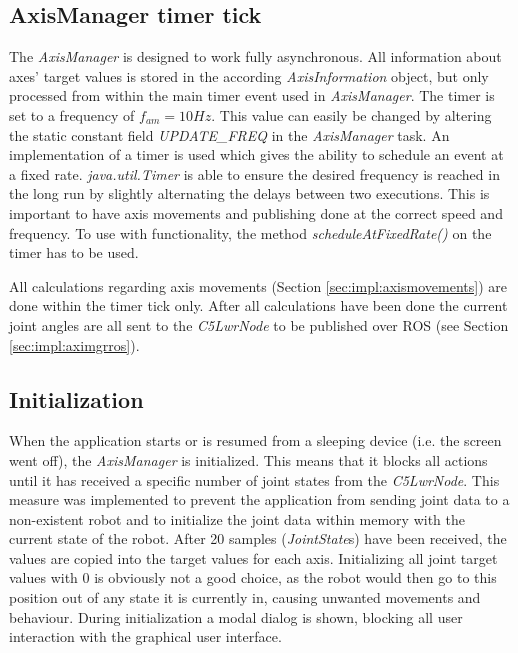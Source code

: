 \subsection{AxisManager timer tick}

The \textit{AxisManager} is designed to work fully asynchronous. All information about axes' target values is stored in the according \textit{AxisInformation} object, but only processed from within the main timer event used in \textit{AxisManager}. The timer is set to a frequency of $f_{am} = 10Hz$. This value can easily be changed by altering the static constant field \textit{UPDATE\_FREQ} in the \textit{AxisManager} task. An implementation of a timer is used which gives the ability to schedule an event at a fixed rate. \textit{java.util.Timer} is able to ensure the desired frequency is reached in the long run by slightly alternating the delays between two executions\cite{AndroidTimer2018}. This is important to have axis movements and publishing done at the correct speed and frequency. To use with functionality, the method \textit{scheduleAtFixedRate()} on the timer has to be used. 

All calculations regarding axis movements (Section \ref{sec:impl:axismovements}) are done within the timer tick only. After all calculations have been done the current joint angles are all sent to the \textit{C5LwrNode} to be published over ROS (see Section \ref{sec:impl:aximgrros}).

\subsection{Initialization}

When the application starts or is resumed from a sleeping device (i.e. the screen went off), the \textit{AxisManager} is initialized. This means that it blocks all actions until it has received a specific number of joint states from the \textit{C5LwrNode}. This measure was implemented to prevent the application from sending joint data to a non-existent robot and to initialize the joint data within memory with the current state of the robot. After 20 samples (\textit{JointState}s) have been received, the values are copied into the target values for each axis.
Initializing all joint target values with 0 is obviously not a good choice, as the robot would then go to this position out of any state it is currently in, causing unwanted movements and behaviour. During initialization a modal dialog is shown, blocking all user interaction with the graphical user interface.

